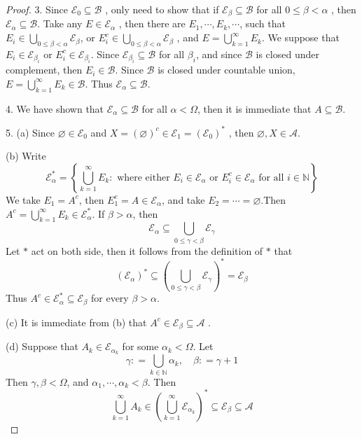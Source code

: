 \documentclass[../main.tex]{subfiles}
\begin{document}
\begin{proof}
    3. Since \(  \mathcal{E}_{0} \subseteq  \mathcal{B}  \) , only need to show that if \(  \mathcal{E}_{\beta } \subseteq \mathcal{B}  \) for all \(  0\le \beta < \alpha   \) , then \(  \mathcal{E}_{\alpha }\subseteq \mathcal{B}  \). Take any \(  E \in \mathcal{E}_{\alpha }  \) , then there are \(   E_1,\cdots,E_k ,\cdots   \), such that \(  E_{i} \in \bigcup _{0 \le \beta < \alpha }\mathcal{E}_{\beta }  \), or \(  E_{i}^{c}\in \bigcup _{0 \le \beta < \alpha } \mathcal{E}_{\beta }  \) , and \(  E=  \bigcup _{k= 1}^{\infty}E_{k}  \).  We suppose that \(  E_{i} \in \mathcal{E}_{\beta _{i}}  \) or \(  E_{i}^{c} \in \mathcal{E}_{\beta _{i}}  \). Since \(  \mathcal{E}_{\beta _{i}} \subseteq \mathcal{B}  \) for all \(  \beta _{i}  \), and since \(  \mathcal{B}  \) is closed under complement, then \(  E_{i} \in \mathcal{B}  \). Since \(  \mathcal{B}  \) is closed under countable union, \(  E= \bigcup _{k = 1}^{\infty}E_{k} \in \mathcal{B}  \). Thus \(  \mathcal{E}_{\alpha } \subseteq \mathcal{B}  \). 

    4. We have shown that \(  \mathcal{E}_{\alpha } \subseteq \mathcal{B}  \) for all \(  \alpha <  \Omega   \),  then it is immediate that \(  A\subseteq \mathcal{B}  \).  

    5. (a)  Since \(  \varnothing \in \mathcal{E}_{0}  \) and \(  X= \left( \varnothing \right)^{c}\in \mathcal{E}_{1}= \left( \mathcal{E}_{0} \right)^{*}   \)  , then \(  \varnothing,X \in \mathcal{A}  \).

    (b)  Write \[
    \mathcal{E}_{\alpha }^{*}= \left\{ \bigcup _{k= 1}^{\infty}E_{k}: \text{  where either }E_{i} \in \mathcal{E}_{\alpha } \text{ or } E_{i}^{c}\in \mathcal{E}_{\alpha }\text{ for all } i\in \mathbb{N}  \right\}
    \]We take \(  E_1 = A^{c} \), then \(  E_1^{c}= A\in \mathcal{E}_{\alpha }  \), and take \(  E_{2}= \cdots = \varnothing  \).Then \(  A^{c}= \bigcup _{k = 1}^{\infty}E_{k} \in \mathcal{E}_{\alpha }^{*}  \). If \(  \beta  >  \alpha   \), then  \[
   \mathcal{E}_{\alpha }\subseteq  \bigcup _{0 \le  \gamma < \beta }\mathcal{E}_{ \gamma  }
    \]   Let \(  *  \) act on both side, then it follows from the definition of \(  *  \) that \[
    \left( \mathcal{E}_{\alpha } \right)^{*}\subseteq \left( \bigcup _{0\le  \gamma < \beta }\mathcal{E}_{ \gamma } \right)^{*}= \mathcal{E}_{\beta }  
    \]  Thus \(  A^{c} \in \mathcal{E}_{\alpha }^{*}\subseteq \mathcal{E}_{\beta }  \) for every \(  \beta > \alpha   \). 
    
    (c) It is immediate from (b) that \(  A^{c} \in \mathcal{E}_{\beta }\subseteq \mathcal{A}  \) .

    (d) Suppose that \(  A_{k} \in \mathcal{E}_{\alpha _{k}}  \) for some \(  \alpha _{k}<  \Omega   \). Let \[
     \gamma : = \bigcup _{k \in \mathbb{N} }\alpha _{k},\quad \beta : =  \gamma + 1
    \] Then \(   \gamma ,\beta <  \Omega   \), and \(  \alpha _1 ,\cdots ,\alpha _{k}< \beta   \). Then \[
    \bigcup _{k = 1}^{\infty}A_{k}\in \left( \bigcup _{k = 1}^{\infty} \mathcal{E}_{\alpha _{k}} \right)^{*}\subseteq \mathcal{E}_{\beta }\subseteq \mathcal{A} 
    \]   
    
\end{proof}
\end{document}
